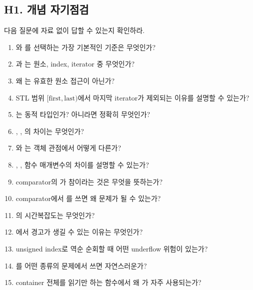 \subsection{H1. 개념 자기점검}
다음 질문에 자료 없이 답할 수 있는지 확인하라.
\begin{enumerate}
  \item {}와 를 선택하는 가장 기본적인 기준은 무엇인가?
  \item {}과 는 원소, index, iterator 중 무엇인가?
  \item 왜 는 유효한 원소 접근이 아닌가?
  \item STL 범위 $[\text{first},\text{last})$에서 마지막 iterator가 제외되는 이유를 설명할 수 있는가?
  \item {}는 동적 타입인가? 아니라면 정확히 무엇인가?
  \item {}, , 의 차이는 무엇인가?
  \item {}와 는 객체 관점에서 어떻게 다른가?
  \item {}, ,  함수 매개변수의 차이를 설명할 수 있는가?
  \item comparator의 가 참이라는 것은 무엇을 뜻하는가?
  \item comparator에서 \code{<=}를 쓰면 왜 문제가 될 수 있는가?
  \item {}의 시간복잡도는 무엇인가?
  \item {}에서 경고가 생길 수 있는 이유는 무엇인가?
  \item unsigned index로 역순 순회할 때 어떤 underflow 위험이 있는가?
  \item {}를 어떤 종류의 문제에서 쓰면 자연스러운가?
  \item container 전체를 읽기만 하는 함수에서 왜 가 자주 사용되는가?
\end{enumerate}

